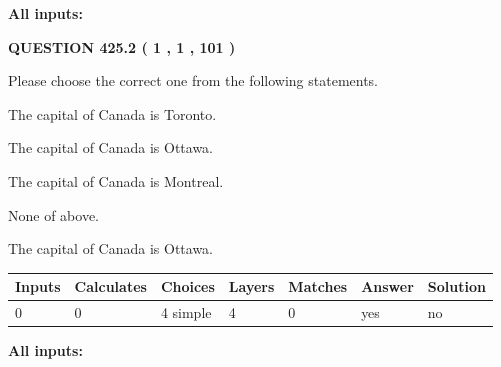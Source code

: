 \documentclass[12pt]{article}
\begin{document}
   
   
   
\noindent{}
   
   
   
   
\noindent\vspace{0.1in}\hspace{-0.08in} {\textbf{\Large{All inputs: }}}
   
   
  
\vspace{0.2in}
  
{\textbf{\Large{QUESTION
425.2 
 ( 1 , 1 , 101 )
}}}
  
  
Please choose the correct one from the following statements.
 
 
The capital of Canada is Toronto.
 
 
The capital of Canada is Ottawa.
 
 
The capital of Canada is Montreal.
 
 
 None of above.
 
 
\noindent{}
 
 
The capital of Canada is Ottawa.
 
 
\noindent{}
 
 
   
   
   
   
\noindent\begin{tabular}{|l|l|l|l|l|l|l|}
 \hline
Inputs & Calculates & Choices & Layers & Matches & Answer & Solution \\ \hline
 0  & 
 0  & 
 4
  simple  
  & 
 4  & 
 0  & 
  yes & 
  no 
  \\ \hline
 \end{tabular}
   
   
   
   
\noindent{}
   
   
   
   
\noindent\vspace{0.1in}\hspace{-0.08in} {\textbf{\Large{All inputs: }}}
   
\end{document}
